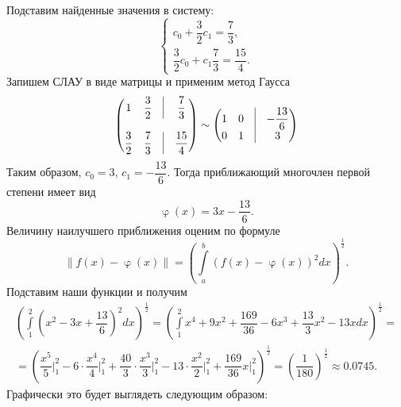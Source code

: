 \documentclass[a4paper, 12pt]{article}
\renewcommand{\varphi}{\upvarphi}
\newcommand\Norm[1]{\left\| #1 \right\|}
\begin{document}
\begin{enumerate}
		Подставим найденные значения в систему:
		$$\begin{cases}
			c_0+ \dfrac32c_1= \dfrac73,\\
			\dfrac32c_0+ c_1\dfrac73= \dfrac{15}{4}.
		\end{cases}$$
		Запишем СЛАУ в виде матрицы и применим метод Гаусса $$\begin{pmatrix}
			1 & \dfrac32 & \vline & \dfrac73\\\\
			\dfrac32 & \dfrac73 & \vline & \dfrac{15}{4}
		\end{pmatrix}
		\sim
		\begin{pmatrix}
			1 & 0 & \vline & -\dfrac{13}{6}\\
			0 & 1 & \vline & 3
		\end{pmatrix}
		$$
		Таким образом, $c_0 = 3$, $c_1 = -\dfrac{13}{6}$. Тогда приближающий многочлен первой степени имеет вид $$\varphi(x) = 3x - \dfrac{13}{6}.$$
		Величину наилучшего приближения оценим по формуле $$\Norm{f(x) - \varphi(x)} = \left(\int\limits_a^b(f(x) - \varphi(x))^2dx\right)^{\frac12}.$$
		Подставим наши функции и получим \begin{multline*}
			\left(\int\limits_1^2\left(x^2 - 3x + \dfrac{13}{6}\right)^2dx\right)^{\frac12} = \left(\int\limits_1^2x^4 + 9x^2+\dfrac{169}{36} - 6x^3 + \dfrac{13}{3}x^2 - 13xdx\right)^{\frac12} =\\= \left(\dfrac{x^5}{5}\Big|_1^2 -6\cdot \dfrac{x^4}{4}\Big|_1^2+ \dfrac{40}{3}\cdot\dfrac{x^3}{3}\Big|_1^2 - 13\cdot \dfrac{x^2}{2}\Big|_1^2 + \dfrac{169}{36}x\Big|_1^2\right)^{\frac12} = \left(\dfrac{1}{180}\right)^{\frac12} \approx 0.0745.
		\end{multline*}
		Графически это будет выглядеть следующим образом:
		\begin{center}\end{center}
		

\end{enumerate}
\end{document}
